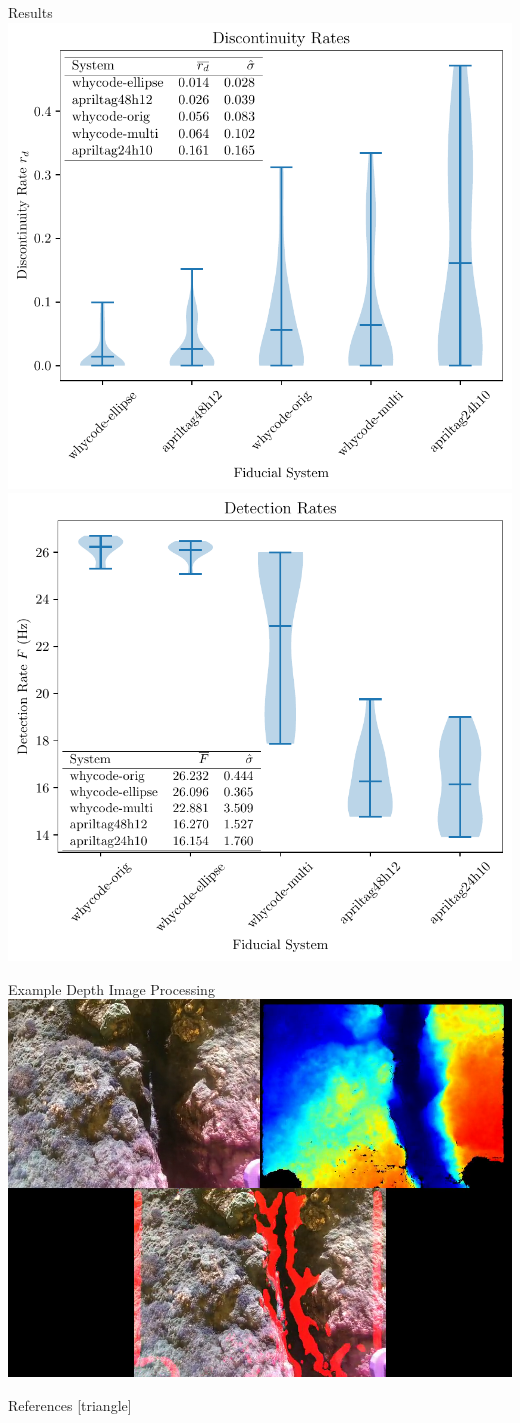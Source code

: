 \documentclass[aspectratio=169]{beamer}
\begin{document}
\begin{frame}{Results}
    \centering
    \includegraphics[width=0.49\linewidth]{./images/violin_plot_five_member}
    \includegraphics[width=0.49\linewidth]{./images/violin_plot_speed_five_member}
\end{frame}

\begin{frame}{Example Depth Image Processing}
	\centering
	\includegraphics[height=\textheight]{./images/depth_processing_screenshot}
\end{frame}

\begin{frame}{References}
	[triangle]
	
	
\end{frame}
\end{document}
